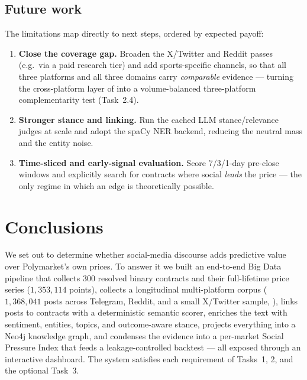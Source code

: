 \section{Future work}
The limitations map directly to next steps, ordered by expected payoff:
\begin{enumerate}
  \item \textbf{Close the coverage gap.} Broaden the X/Twitter and Reddit passes (e.g.\
  via a paid research tier) and add sports-specific channels, so that all three platforms
  and all three domains carry \emph{comparable} evidence --- turning the cross-platform
  layer of \Cref{ch:crossplatform} into a volume-balanced three-platform complementarity
  test (Task~2.4).
  \item \textbf{Stronger stance and linking.} Run the cached LLM stance/relevance
  judges at scale and adopt the spaCy NER backend, reducing the neutral mass and the
  entity noise.
  \item \textbf{Time-sliced and early-signal evaluation.} Score 7/3/1-day pre-close
  windows and explicitly search for contracts where social \emph{leads} the price ---
  the only regime in which an edge is theoretically possible.
\end{enumerate}


\chapter{Conclusions}
\label{ch:conclusions}

We set out to determine whether social-media discourse adds predictive value over
Polymarket's own prices. To answer it we built an end-to-end Big Data pipeline that
collects 300 resolved binary contracts and their full-lifetime price series
($1{,}353{,}114$ points), collects a longitudinal multi-platform corpus
($1{,}368{,}041$ posts across Telegram, Reddit, and a small X/Twitter sample,
\Cref{sec:scope}), links posts to contracts with a deterministic semantic scorer,
enriches the text
with sentiment, entities, topics, and outcome-aware stance, projects everything into a
Neo4j knowledge graph, and condenses the evidence into a per-market Social Pressure
Index that feeds a leakage-controlled backtest --- all exposed through an interactive
dashboard. The system satisfies each requirement of Tasks~1, 2, and the optional
Task~3.

